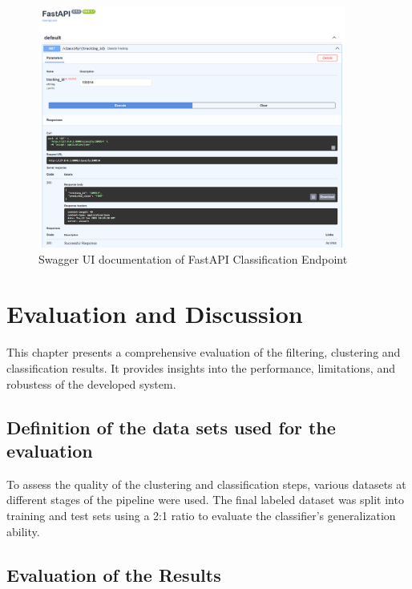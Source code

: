 \documentclass[a4paper,12pt,twoside]{scrreprt}
\begin{document}
\begin{figure}[htbp]
  \centering

  \includegraphics[width=0.9\textwidth]{Figures/api/fastapi_documentation.png}
  \caption{Swagger UI documentation of FastAPI Classification Endpoint}
  \label{fig:fastapi_docs}
\end{figure}

\chapter{Evaluation and Discussion}
This chapter presents a comprehensive evaluation of the filtering, clustering
and
classification results.
It provides insights into the performance, limitations, and robustess of the
developed system.

\section{Definition of the data sets used for the evaluation}

To assess the quality of the clustering and classification steps, various
datasets at different stages of the pipeline were used.
The final labeled dataset was split into training and test sets using a 2:1
ratio to evaluate the classifier's generalization ability.

\section{Evaluation of the Results}
\end{document}

